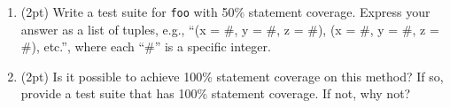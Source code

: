 \documentclass{report}
\newif\ifkey
\newcommand{\answerlong}[1]{\ifkey\color{red}\textbf{#1}\color{black}\else\vspace{0.5in}\fi\xspace}
\newcommand*{\pts}[1]{\addtocounter{points}{#1}(#1pt)}
\begin{document}
\begin{spacing}{1.4}
\begin{enumerate}[leftmargin=*]
    

    Questions on this page refer to \textbf{Document A}.
    Assume that the only statements we are interested in are \lstinline{STATEMENT 1} through \lstinline{STATEMENT 4}.

  \item \label{sl1} \pts{2} Write a test suite for \lstinline{foo} with 50\% statement coverage. Express your answer as a list of tuples, e.g., ``(x = \#, y = \#, z = \#), (x = \#, y = \#, z = \#), etc.'', where each ``\#'' is a specific integer. \\
  \answerlong{(x = 6, y = 0, z = 3)}
    
  \item \pts{2} Is it possible to achieve 100\% statement coverage on this method? If so, provide a test suite that has 100\% statement coverage. If not, why not? \\
    \answerlong{It is not possible, because STATEMENT 2 is unreachable.}


\end{enumerate}
\end{spacing}
\end{document}
